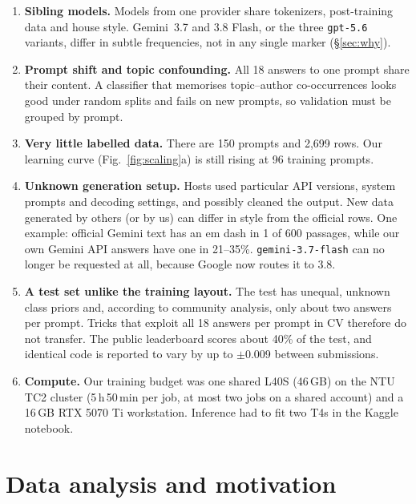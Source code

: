 \documentclass[10pt,twocolumn,letterpaper]{article}
\begin{document}
\begin{enumerate}[label=\textbf{C\arabic*},leftmargin=2.2em,labelsep=0.5em]
\item \textbf{Sibling models.} Models from one provider share tokenizers, post-training data and house style. Gemini~3.7 and 3.8 Flash, or the three \texttt{gpt-5.6} variants, differ in subtle frequencies, not in any single marker (\S\ref{sec:why}).
\item \textbf{Prompt shift and topic confounding.} All 18 answers to one prompt share their content. A classifier that memorises topic--author co-occurrences looks good under random splits and fails on new prompts, so validation must be grouped by prompt.
\item \textbf{Very little labelled data.} There are 150 prompts and 2,699 rows. Our learning curve (Fig.~\ref{fig:scaling}a) is still rising at 96 training prompts.
\item \textbf{Unknown generation setup.} Hosts used particular API versions, system prompts and decoding settings, and possibly cleaned the output. New data generated by others (or by us) can differ in style from the official rows. One example: official Gemini text has an em dash in 1 of 600 passages, while our own Gemini API answers have one in 21--35\%. \texttt{gemini-3.7-flash} can no longer be requested at all, because Google now routes it to 3.8.
\item \textbf{A test set unlike the training layout.} The test has unequal, unknown class priors and, according to community analysis, only about two answers per prompt. Tricks that exploit all 18 answers per prompt in CV therefore do not transfer. The public leaderboard scores about 40\% of the test, and identical code is reported to vary by up to $\pm$0.009 between submissions.
\item \textbf{Compute.} Our training budget was one shared L40S (46\,GB) on the NTU TC2 cluster (5\,h\,50\,min per job, at most two jobs on a shared account) and a 16\,GB RTX 5070 Ti workstation. Inference had to fit two T4s in the Kaggle notebook.
\end{enumerate}

\section{Data analysis and motivation}
\label{sec:motivation}
\end{document}
